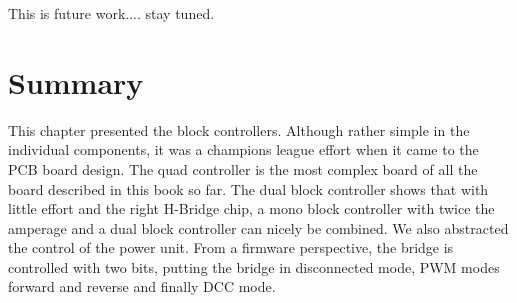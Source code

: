 This is future work.... stay tuned.

\section{Summary}

This chapter presented the block controllers. Although rather simple in the individual components, it was a champions league effort when it came to the PCB board design. The quad controller is the most complex board of all the board described in this book so far. The dual block controller shows that with little effort and the right H-Bridge chip, a mono block controller with twice the amperage and a dual block controller can nicely be combined. We also abstracted the control of the power unit. From a firmware perspective, the bridge is controlled with two bits, putting the bridge in disconnected mode, PWM modes forward and reverse and finally DCC mode.

